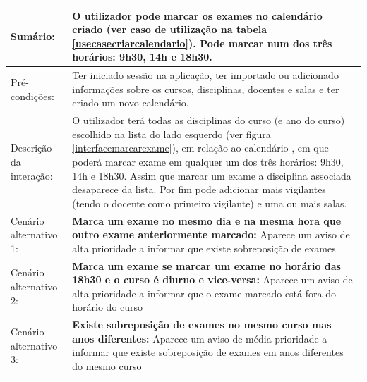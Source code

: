 \documentclass[11pt, twoside]{report}
\begin{document}
\begin{center}
\begin{longtable}{|m{4cm}|m{12cm}|}
			\hline
			Sumário:                   & O utilizador pode marcar os exames no calendário criado (ver caso de utilização na tabela \ref{usecasecriarcalendario}). Pode marcar num dos três horários: 9h30, 14h e 18h30.                                                                                                                                                                                                                                                         \\
			\hline
			Pré-condições:           & Ter iniciado sessão na aplicação, ter importado ou adicionado informações sobre os cursos, disciplinas, docentes e salas e ter criado um novo calendário.                                                                                                                                                                                                                                                                             \\
			\hline
			Descrição da interação: & O utilizador terá todas as disciplinas do curso (e ano do curso) escolhido na lista do lado esquerdo (ver figura \ref{interfacemarcarexame}), em relação ao calendário , em que poderá marcar exame em qualquer um dos três horários: 9h30, 14h e 18h30. Assim que marcar um exame a disciplina associada desaparece da lista. Por fim pode adicionar mais vigilantes (tendo o docente como primeiro vigilante) e uma ou mais salas. \\
			\hline
			Cenário alternativo 1:     & \textbf{Marca um exame no mesmo dia e na mesma hora que outro exame anteriormente marcado:} Aparece um aviso de alta prioridade a informar que existe sobreposição de exames                                                                                                                                                                                                                                                              \\
			\hline
			
			
			Cenário alternativo 2:     & \textbf{Marca um exame se marcar um exame no horário das 18h30 e o curso é diurno e vice-versa:} Aparece um aviso de alta prioridade a informar que o exame marcado está fora do horário do curso                                                                                                                                                                                                                                       \\
			\hline
			
			Cenário alternativo 3:     & \textbf{Existe sobreposição de exames no mesmo curso mas anos diferentes:} Aparece um aviso de média prioridade a informar que existe sobreposição de exames em anos diferentes do mesmo curso                                                                                                                                                                                                                                         \\
			\hline
		\end{longtable}
	\end{center}
	
\end{document}

